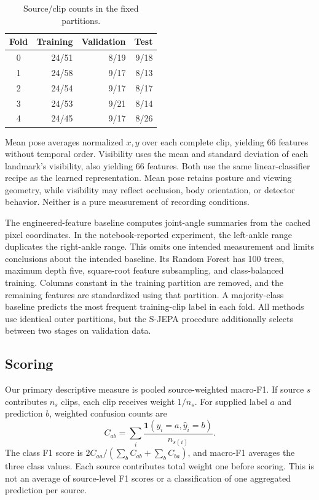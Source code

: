 \documentclass[10pt,twocolumn,letterpaper]{article}
\begin{document}
\begin{table}[t]
\centering
\caption{Source/clip counts in the fixed partitions.}
\label{tab:splits}
\begin{tabular}{crrr}
\toprule
Fold & Training & Validation & Test\\
\midrule
0&24/51&8/19&9/18\\
1&24/58&9/17&8/13\\
2&24/54&9/17&8/17\\
3&24/53&9/21&8/14\\
4&24/45&9/17&8/26\\
\bottomrule
\end{tabular}
\end{table}

Mean pose averages normalized $x,y$ over each complete clip, yielding 66 features without temporal order. Visibility uses the mean and standard deviation of each landmark's visibility, also yielding 66 features. Both use the same linear-classifier recipe as the learned representation. Mean pose retains posture and viewing geometry, while visibility may reflect occlusion, body orientation, or detector behavior. Neither is a pure measurement of recording conditions.

The engineered-feature baseline computes joint-angle summaries from the cached pixel coordinates. In the notebook-reported experiment, the left-ankle range duplicates the right-ankle range. This omits one intended measurement and limits conclusions about the intended baseline. Its Random Forest has 100 trees, maximum depth five, square-root feature subsampling, and class-balanced training. Columns constant in the training partition are removed, and the remaining features are standardized using that partition. A majority-class baseline predicts the most frequent training-clip label in each fold. All methods use identical outer partitions, but the S-JEPA procedure additionally selects between two stages on validation data.

\subsection{Scoring}
Our primary descriptive measure is pooled source-weighted macro-F1. If source $s$ contributes $n_s$ clips, each clip receives weight $1/n_s$. For supplied label $a$ and prediction $b$, weighted confusion counts are
\begin{equation}
C_{ab}=\sum_i \frac{\mathbf{1}(y_i=a,\widehat{y}_i=b)}{n_{s(i)}}.
\end{equation}
The class F1 score is $2C_{aa}/(\sum_b C_{ab}+\sum_b C_{ba})$, and macro-F1 averages the three class values. Each source contributes total weight one before scoring. This is not an average of source-level F1 scores or a classification of one aggregated prediction per source.
\end{document}
